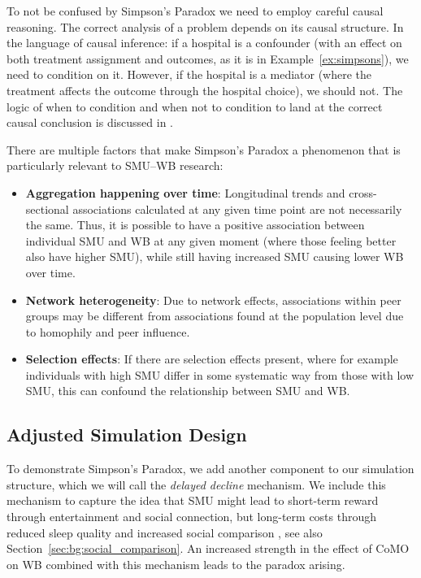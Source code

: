 To not be confused by Simpson's Paradox we need to employ careful causal reasoning. The correct analysis of a problem depends on its causal structure. In the language of causal inference: if a hospital is a confounder (with an effect on both treatment assignment and outcomes, as it is in Example~\ref{ex:simpsons}), we need to condition on it. However, if the hospital is a mediator (where the treatment affects the outcome through the hospital choice), we should not. The logic of when to condition and when not to condition to land at the correct causal conclusion is discussed in \textcite[Ch.~6]{Pearl2009}.

There are multiple factors that make Simpson's Paradox a phenomenon that is particularly relevant to SMU--WB research:
\begin{itemize}
    \item \textbf{Aggregation happening over time}: Longitudinal trends and cross-sectional associations calculated at any given time point are not necessarily the same. Thus, it is possible to have a positive association between individual SMU and WB at any given moment (where those feeling better also have higher SMU), while still having increased SMU causing lower WB over time.
    \item \textbf{Network heterogeneity}: Due to network effects, associations within peer groups may be different from associations found at the population level due to homophily \parencite{McPherson2001} and peer influence.
    \item \textbf{Selection effects}: If there are selection effects present, where for example individuals with high SMU differ in some systematic way from those with low SMU, this can confound the relationship between SMU and WB\@.
\end{itemize}

\subsection{Adjusted Simulation Design}
\label{sec:abm:simpsons:design}
To demonstrate Simpson's Paradox, we add another component to our simulation structure, which we will call the \emph{delayed decline} mechanism. We include this mechanism to capture the idea that SMU might lead to short-term reward through entertainment and social connection, but long-term costs through reduced sleep quality and increased social comparison \parencites{Valkenburg2022}[Ch.~5]{Haidt2024}, see also Section~\ref{sec:bg:social_comparison}. An increased strength in the effect of CoMO on WB combined with this mechanism leads to the paradox arising.

